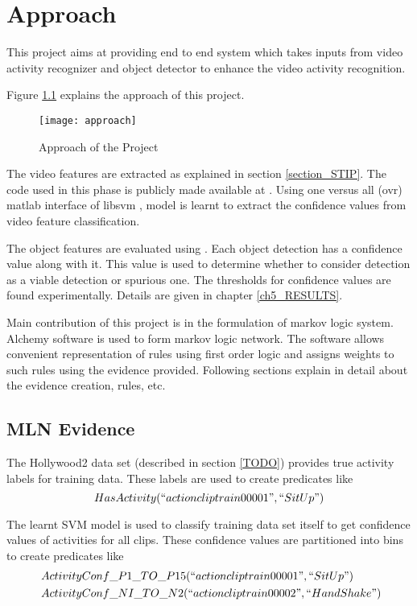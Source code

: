 \chapter{Approach}
\label{ch4_APPROACH}

This project aims at providing end to end system which takes inputs from
video activity recognizer and object detector to enhance the video activity recognition.

Figure \ref{fig:approach} explains the approach of this project.
\begin{figure}[H]
\begin{center}	
	\texttt{[image: approach]} 
\caption{Approach of the Project}
\label{fig:approach}
\end{center}
\end{figure}

The video features are extracted as explained in section \ref{section_STIP}.
The code used in this phase is publicly made available at \cite{stipCode}.
Using one versus all (ovr) matlab interface of libsvm \cite{libsvm}, model is learnt to extract the 
confidence values from video feature classification.

The object features are evaluated using \cite{voc-release4}. 
Each object detection has a confidence value along with it.
This value is used to determine whether to consider detection
as a viable detection or spurious one. The thresholds for confidence
values are found experimentally. Details are given in chapter \ref{ch5_RESULTS}.

Main contribution of this project is in the formulation of
markov logic system. Alchemy \cite{alchemy2.0} software is
used to form markov logic network. The software allows convenient
representation of rules using first order logic and assigns weights to
such rules using the evidence provided. Following sections explain in detail
about the evidence creation, rules, etc.

\section{MLN Evidence}
The Hollywood2 data set \cite{hollywood2} (described in section \ref{TODO}) provides
true activity labels for training data. These labels are used to create predicates
like
\begin{equation}
	HasActivity( ``actioncliptrain00001", ``SitUp" )
\end{equation}

The learnt SVM model is used to classify training data set itself to get
confidence values of activities for all clips. These confidence values
are partitioned into bins to create predicates like
\begin{equation}
	\begin{split}
		~ & ActivityConf\_P1\_TO\_P15(``actioncliptrain00001",``SitUp") \\
		~ & ActivityConf\_NI\_TO\_N2(``actioncliptrain00002",``HandShake")
	\end{split}
\end{equation}

